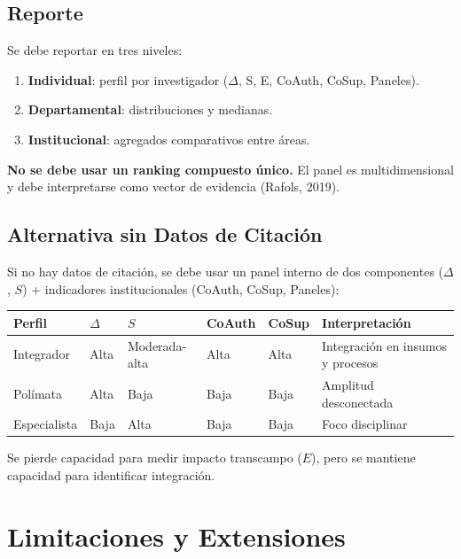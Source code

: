 \documentclass[
]{article}
\providecommand{\tightlist}{%
  \setlength{\itemsep}{0pt}\setlength{\parskip}{0pt}}
\begin{document}
\hypertarget{reporte}{%
\subsection{Reporte}\label{reporte}}

Se debe reportar en tres niveles:

\begin{enumerate}
\def\labelenumi{\arabic{enumi}.}
\tightlist
\item
  \textbf{Individual}: perfil por investigador (\(\Delta\), S, E,
  CoAuth, CoSup, Paneles).
\item
  \textbf{Departamental}: distribuciones y medianas.
\item
  \textbf{Institucional}: agregados comparativos entre áreas.
\end{enumerate}

\textbf{No se debe usar un ranking compuesto único.} El panel es
multidimensional y debe interpretarse como vector de evidencia (Rafols,
2019).

\hypertarget{alternativa-sin-datos-de-citaciuxf3n}{%
\subsection{Alternativa sin Datos de
Citación}\label{alternativa-sin-datos-de-citaciuxf3n}}

Si no hay datos de citación, se debe usar un panel interno de dos
componentes (\(\Delta\), \(S\)) + indicadores institucionales (CoAuth,
CoSup, Paneles):

\begin{longtable}[]{@{}llllll@{}}
\toprule
Perfil & \(\Delta\) & \(S\) & CoAuth & CoSup & Interpretación \\
\midrule
\endhead
Integrador & Alta & Moderada-alta & Alta & Alta & Integración en insumos
y procesos \\
Polímata & Alta & Baja & Baja & Baja & Amplitud desconectada \\
Especialista & Baja & Alta & Baja & Baja & Foco disciplinar \\
\bottomrule
\end{longtable}

Se pierde capacidad para medir impacto transcampo (\(E\)), pero se
mantiene capacidad para identificar integración.

\hypertarget{limitaciones-y-extensiones}{%
\section{Limitaciones y Extensiones}\label{limitaciones-y-extensiones}}
\end{document}
